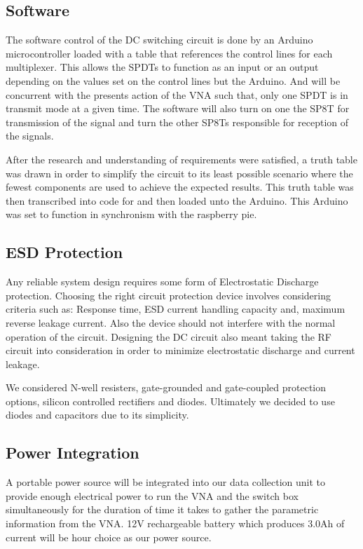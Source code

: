 \subsection{Software}

The software control of the DC switching circuit is done by an Arduino microcontroller loaded with a table that references the control lines for each multiplexer. This allows the SPDTs to function as an input or an output depending on the values set on the control lines but the Arduino. And will be concurrent with the presents action of the VNA such that, only one SPDT is in transmit mode at a given time. The software will also turn on one the SP8T for transmission of the signal and turn the other SP8Ts responsible for reception of the signals. 

After the research and understanding of requirements were satisfied, a truth table was drawn in order to simplify the circuit to its least possible scenario where the fewest components are used to achieve the expected results. This truth table was then transcribed into code for and then loaded unto the Arduino. This Arduino was set to function in synchronism with the raspberry pie.

\subsection{ESD Protection}

Any reliable system design requires some form of Electrostatic Discharge protection. Choosing the right circuit protection device involves considering criteria such as: Response time, ESD current handling capacity and, maximum reverse leakage current. Also the device should not interfere with the normal operation of the circuit. Designing the DC circuit also meant taking the RF circuit into consideration in order to minimize electrostatic discharge and current leakage. 

We considered N-well resisters, gate-grounded and gate-coupled protection options, silicon controlled rectifiers and diodes. Ultimately we decided to use diodes and capacitors due to its simplicity.

\subsection{Power Integration}

A portable power source will be integrated into our data collection unit to provide enough electrical power to run the VNA and the switch box simultaneously for the duration of time it takes to gather the parametric information from the VNA. 12V rechargeable battery which produces 3.0Ah of current will be hour choice as our power source.

